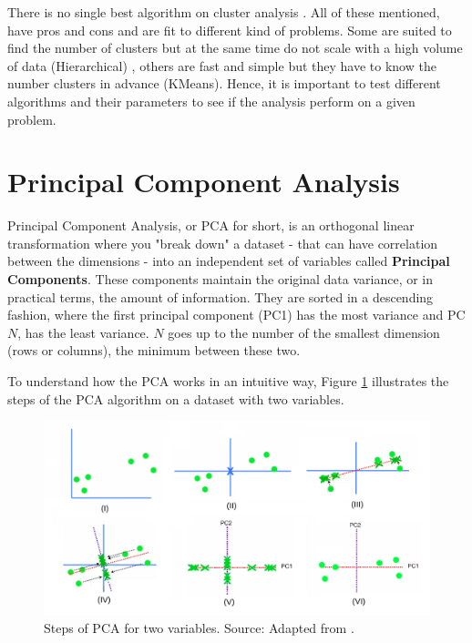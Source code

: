 There is no single best algorithm on cluster analysis \cite{james2013introduction}. All of these mentioned, have pros and cons and are fit to different kind of problems. Some are suited to find the number of clusters but at the same time do not scale with a high volume of data (Hierarchical) \cite{franti2006fast}, others are fast and simple but they have to know the number clusters in advance (KMeans). Hence, it is important to test different algorithms and their parameters to see if the analysis perform on a given problem.

\section{Principal Component Analysis}

Principal Component Analysis, or PCA for short, is an orthogonal linear transformation \cite{wikipedia_pca} where you "break down" a dataset - that can have correlation between the dimensions - into an independent set of variables called \textbf{Principal Components}. These components maintain the original data variance, or in practical terms, the amount of information. They are sorted in a descending fashion, where the first principal component (PC1) has the most variance and PC$N$, has the least variance. $N$ goes up to the number of the smallest dimension (rows or columns), the minimum between these two. 

To understand how the PCA works in an intuitive way, Figure \ref{fig:pca-steps} illustrates the steps of the PCA algorithm on a dataset with two variables.

\begin{figure}[h]
   \centering
   \includegraphics[width=\linewidth]{fig/ch2-pca-steps.png}
   \caption{Steps of PCA for two variables. Source: Adapted from \cite{pcastepsyoutube}.}
   \label{fig:pca-steps}
\end{figure}

